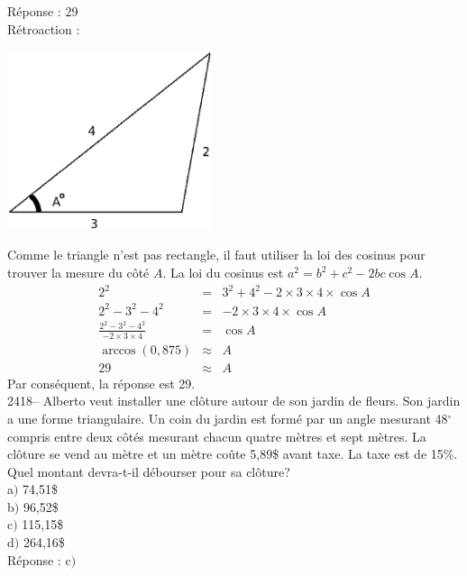 \documentclass[letterpaper, 12pt]{article}
\begin{document}
R\'eponse : 29\\

R\'etroaction :\\
\begin{center}
 \includegraphics[width=6cm,bb=0 491 494 842]{Q2417.eps}
\end{center}
Comme le triangle n'est pas rectangle, il faut utiliser la loi des cosinus pour trouver la mesure du c\^ot\'e $A$. La loi du cosinus est $a^{2}=b^{2}+c^{2}-2bc\cos{A}$.
\begin{eqnarray*}
 2^{2} &=& 3^{2} + 4^{2} - 2 \times 3 \times 4 \times \cos{A}\\[2mm]
 2^{2}- 3^{2} - 4^{2}&=&  - 2 \times 3 \times 4 \times \cos{A}\\[2mm]
\frac{ 2^{2}- 3^{2} - 4^{2}}{- 2 \times 3 \times 4 }&=& \cos{A}\\[2mm]
\arccos{(0,875)}&\approx& A\\[2mm]
29&\approx& A
\end{eqnarray*}
Par cons\'equent, la r\'eponse est 29.\\

2418-- Alberto veut installer une cl\^oture autour de son jardin de fleurs. Son jardin a une forme triangulaire. Un coin du jardin est form\'e par un angle mesurant 48$^{\circ}$ compris entre deux c\^ot\'es mesurant chacun quatre m\`etres et sept m\`etres. La cl\^oture se vend au m\`etre et un m\`etre co\^ute 5,89\$ avant taxe. La taxe est de 15\%. Quel montant devra-t-il d\'ebourser pour sa cl\^oture? \\

a$)$ 74,51\$\\
b$)$ 96,52\$\\
c$)$ 115,15\$\\
d$)$ 264,16\$\\


R\'eponse : c$)$\\
\end{document}
